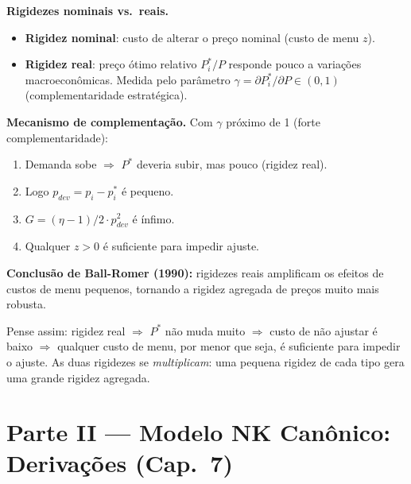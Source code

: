 \documentclass[12pt, a4paper]{article}
\begin{document}
\textbf{Rigidezes nominais vs.\ reais.}
\begin{itemize}[leftmargin=1.5em, itemsep=2pt]
  \item \textbf{Rigidez nominal}: custo de alterar o preço nominal (custo de menu $z$).
  \item \textbf{Rigidez real}: preço ótimo relativo $P_i^*/P$ responde pouco a variações
        macroeconômicas. Medida pelo parâmetro $\gamma = \partial P_i^*/\partial P \in (0,1)$
        (complementaridade estratégica).
\end{itemize}

\textbf{Mecanismo de complementação.}
Com $\gamma$ próximo de 1 (forte complementaridade):
\begin{enumerate}[leftmargin=1.5em, itemsep=2pt]
  \item Demanda sobe $\Rightarrow$ $P^*$ deveria subir, mas pouco (rigidez real).
  \item Logo $p_{dev} = p_i - p_i^*$ é pequeno.
  \item $G = (\eta-1)/2 \cdot p_{dev}^2$ é ínfimo.
  \item Qualquer $z > 0$ é suficiente para impedir ajuste.
\end{enumerate}
\textbf{Conclusão de Ball-Romer (1990):} rigidezes reais amplificam os efeitos de
custos de menu pequenos, tornando a rigidez agregada de preços muito mais robusta.

\begin{provabox}[title={Ball-Romer: multiplicação de rigidezes}]
Pense assim: rigidez real $\Rightarrow$ $P^*$ não muda muito $\Rightarrow$
custo de não ajustar é baixo $\Rightarrow$ qualquer custo de menu, por menor que seja,
é suficiente para impedir o ajuste. As duas rigidezes se \emph{multiplicam}:
uma pequena rigidez de cada tipo gera uma grande rigidez agregada.
\end{provabox}


\newpage
\section*{\large\color{cyanrbc} Parte II --- Modelo NK Canônico: Derivações (Cap.\ 7)}

\end{document}
